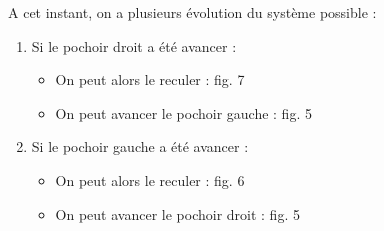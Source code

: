 A cet instant, on a plusieurs évolution du système possible : 
\begin{enumerate}
  \item Si le pochoir droit a été avancer : \\
    \begin{itemize}
      \item On peut alors le reculer : fig. 7
      \item On peut avancer le pochoir gauche : fig. 5
    \end{itemize}
  \item Si le pochoir gauche a été avancer : \\
    \begin{itemize}
      \item On peut alors le reculer : fig. 6
      \item On peut avancer le pochoir droit : fig. 5
    \end{itemize}
\end{enumerate}


